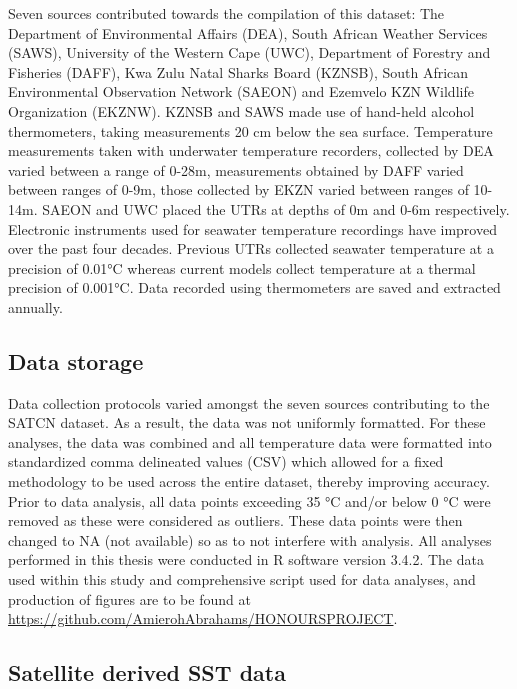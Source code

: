 \documentclass[12pt,]{article}
\begin{document}
Seven sources contributed towards the compilation of this dataset: The
Department of Environmental Affairs (DEA), South African Weather
Services (SAWS), University of the Western Cape (UWC), Department of
Forestry and Fisheries (DAFF), Kwa Zulu Natal Sharks Board (KZNSB),
South African Environmental Observation Network (SAEON) and Ezemvelo KZN
Wildlife Organization (EKZNW). KZNSB and SAWS made use of hand-held
alcohol thermometers, taking measurements 20 cm below the sea surface.
Temperature measurements taken with underwater temperature recorders,
collected by DEA varied between a range of 0-28m, measurements obtained
by DAFF varied between ranges of 0-9m, those collected by EKZN varied
between ranges of 10-14m. SAEON and UWC placed the UTRs at depths of 0m
and 0-6m respectively. Electronic instruments used for seawater
temperature recordings have improved over the past four decades.
Previous UTRs collected seawater temperature at a precision of 0.01°C
whereas current models collect temperature at a thermal precision of
0.001°C. Data recorded using thermometers are saved and extracted
annually.

\subsection{Data storage}\label{data-storage}

Data collection protocols varied amongst the seven sources contributing
to the SATCN dataset. As a result, the data was not uniformly formatted.
For these analyses, the data was combined and all temperature data were
formatted into standardized comma delineated values (CSV) which allowed
for a fixed methodology to be used across the entire dataset, thereby
improving accuracy. Prior to data analysis, all data points exceeding 35
°C and/or below 0 °C were removed as these were considered as outliers.
These data points were then changed to NA (not available) so as to not
interfere with analysis. All analyses performed in this thesis were
conducted in R software version 3.4.2. The data used within this study
and comprehensive script used for data analyses, and production of
figures are to be found at
\url{https://github.com/AmierohAbrahams/HONOURSPROJECT}.

\subsection{Satellite derived SST
data}\label{satellite-derived-sst-data}
\end{document}
